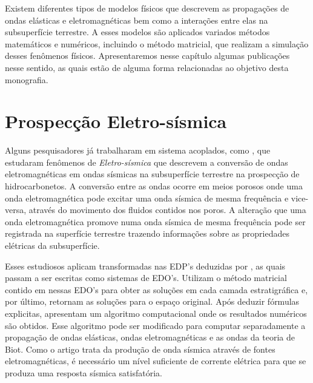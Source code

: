 Existem diferentes tipos de modelos f\'isicos que descrevem as propaga\c{c}\~oes de ondas el\'asticas e eletromagn\'eticas bem como a intera\c{c}\~oes entre elas na subsuperf\'icie terrestre. A esses modelos s\~ao aplicados variados m\'etodos matem\'aticos e num\'ericos, incluindo o m\'etodo matricial, que realizam a simula\c{c}\~ao desses fen\^omenos f\'isicos. Apresentaremos nesse cap\'itulo algumas publica\c{c}\~oes nesse sentido, as quais est\~ao de alguma forma relacionadas ao objetivo desta monografia. 

\section{Prospec\c{c}\~ao Eletro-s\'ismica}

Alguns pesquisadores j\'a trabalharam em sistema acoplados, como \cite{White_Zhou_2006}, que estudaram fen\^omenos de \textit{Eletro-s\'ismica} que descrevem a convers\~ao de ondas eletromagn\'eticas em ondas s\'ismicas na subsuperf\'icie terrestre na prospec\c{c}\~ao de hidrocarbonetos. A convers\~ao entre as ondas ocorre em meios porosos onde uma onda eletromagn\'etica pode excitar uma onda s\'ismica de mesma frequ\^encia e vice-versa, atrav\'es do movimento dos fluidos contidos nos poros. A altera\c{c}\~ao que uma onda eletromagn\'etica promove numa onda s\'ismica de mesma frequ\^encia pode ser registrada na superf\'icie terrestre trazendo informa\c{c}\~oes sobre as propriedades el\'etricas da subsuperf\'icie. 


Esses estudiosos aplicam transformadas nas EDP's deduzidas por \cite{pride_94}, as quais passam a ser escritas como sistemas de EDO's. Utilizam o m\'etodo matricial contido em \cite{Ursin-1983} nessas EDO's para obter as solu\c{c}\~oes em cada camada estratigr\'afica e, por \'ultimo, retornam as solu\c{c}\~oes para o espa\c{c}o original. Ap\'os deduzir f\'ormulas explicitas, apresentam um algoritmo computacional onde os resultados num\'ericos s\~ao obtidos. Esse algoritmo pode ser modificado para computar separadamente a propaga\c{c}\~ao de ondas el\'asticas, ondas eletromagn\'eticas e as ondas da teoria de Biot. Como o artigo trata da produ\c{c}\~ao de onda s\'ismica atrav\'es de fontes eletromagn\'eticas, \'e necess\'ario um n\'ivel suficiente de corrente el\'etrica para que se produza uma resposta s\'ismica satisfat\'oria. 


